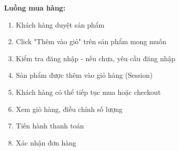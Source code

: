 \textbf{Luồng mua hàng:}
\begin{enumerate}
    \item Khách hàng duyệt sản phẩm
    \item Click "Thêm vào giỏ" trên sản phẩm mong muốn
    \item Kiểm tra đăng nhập - nếu chưa, yêu cầu đăng nhập
    \item Sản phẩm được thêm vào giỏ hàng (Session)
    \item Khách hàng có thể tiếp tục mua hoặc checkout
    \item Xem giỏ hàng, điều chỉnh số lượng
    \item Tiến hành thanh toán
    \item Xác nhận đơn hàng
\end{enumerate}
